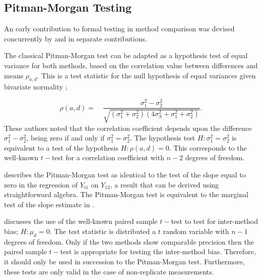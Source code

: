\documentclass[12pt, a4paper]{report}
\theoremstyle{plain}
\theoremstyle{definition}
\theoremstyle{remark}
\begin{document}





\subsection{Pitman-Morgan Testing}
An early contribution to formal testing in method comparison was devised concurrently by \citet{pitman} and \citet{morgan} in separate
contributions. 

The classical Pitman-Morgan test can be adapted as a hypothesis test of equal variance for both methods, based on the correlation value between differences and means $\rho_{a,d}$. This is a test statistic for the null hypothesis of equal variances given bivariate normality ;

\begin{equation}
\rho(a,d)=\quad\frac{\sigma^{2}_{1}-\sigma^{2}_{2}}{\sqrt{(\sigma^{2}_{1}+\sigma^{2}_{2})(4\sigma^{2}_{S}+\sigma^{2}_{1}+\sigma^{2}_{2})}}.
\end{equation}
These authors noted that the correlation coefficient depends
upon the difference $\sigma^{2}_{1}- \sigma^{2}_{2}$, being zero
if and only if $\sigma^{2}_{1}=\sigma^{2}_{2}$. 
The hypothesis test $H: \sigma^{2}_{1}=\sigma^{2}_{2}$ is equivalent to a test of the hypothesis $H: \rho(a,d) = 0$. This corresponds to the well-known $t-$test for a correlation coefficient with $n-2$ degrees of freedom. 
%




\citet{Bartko} describes the Pitman-Morgan test as identical to the test of the slope equal to zero in the regression of $Y_{i1}$ on $Y_{12}$, a result that can be derived using straightforward algebra. The Pitman-Morgan test is equivalent to the marginal test of the slope estimate in \citet{BB89}.

\citet{Bartko} discusses the use of the well-known paired sample $t-$test to test for inter-method bias; $H: \mu_{d}=0$. The test statistic is distributed a $t$ random variable with $n-1$ degrees of freedom. Only if the two methods show comparable precision then the paired sample $t-$test is appropriate for testing the inter-method bias. Therefore, it should only be used in succession to the Pitman-Morgan test. Furthermore, these tests are only valid in the case of non-replicate measurements.
\end{document}

